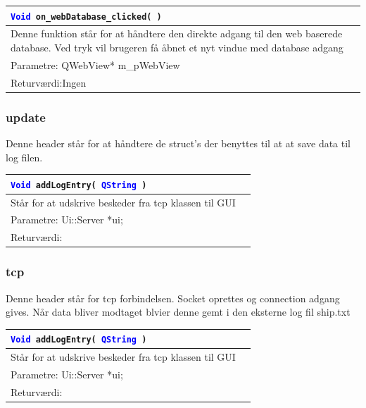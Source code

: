 \begin{table}[H]
\begin{tabular}{l p{12.5cm}}
\multicolumn{2}{l}{\texttt{\textcolor{blue}{Void} on\_webDatabase\_clicked( )}} \\
\hline
Denne funktion står for at håndtere den direkte adgang til den web baserede database. Ved tryk vil brugeren få åbnet et nyt vindue med database adgang \\
Parametre: QWebView* m\_pWebView\\
Returværdi:Ingen\\
\end{tabular}
\end{table}

\subsubsection{update}
Denne header står for at håndtere de struct's der benyttes til at at save data til log filen. 

\begin{table}[H]
\begin{tabular}{l p{12.5cm}}
\multicolumn{2}{l}{\texttt{\textcolor{blue}{Void} addLogEntry( \textcolor{blue}{QString} )}} \\
\hline
Står for at udskrive beskeder fra tcp klassen til GUI \\
Parametre: Ui::Server *ui;\\
Returværdi:&\\
\end{tabular}
\end{table}


\subsubsection{tcp}
Denne header står for tcp forbindelsen. Socket oprettes og connection adgang gives. Når data bliver modtaget blvier denne gemt i den eksterne log fil ship.txt

\begin{table}[H]
\begin{tabular}{l p{12.5cm}}
\multicolumn{2}{l}{\texttt{\textcolor{blue}{Void} addLogEntry( \textcolor{blue}{QString} )}} \\
\hline
Står for at udskrive beskeder fra tcp klassen til GUI \\
Parametre: Ui::Server *ui;\\
Returværdi:&\\
\end{tabular}
\end{table}


